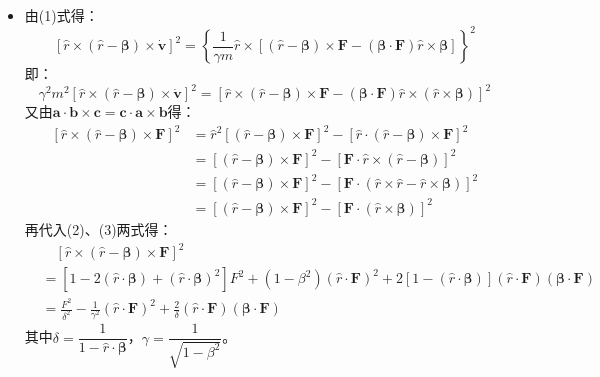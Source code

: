 \documentclass[a4paper,fontset=none]{ctexart}
\begin{document}
\begin{itemize}
    \item[7.(3)]
    由(1)式得：
    \[
        \left[\hat{r} \times (\hat{r}-\bm{\beta}) \times \dot{\bm{v}}\right]^2 = \left\{\frac{1}{\gamma m} \hat{r} \times \left[(\hat{r}-\bm{\beta}) \times \bm{F} - (\bm{\beta} \cdot \bm{F})\hat{r} \times \bm{\beta}\right]\right\}^2
    \]
    即：
    \begin{equation}
        \gamma^2m^2 \left[\hat{r} \times (\hat{r}-\bm{\beta}) \times \dot{\bm{v}}\right]^2 = \left[\hat{r} \times (\hat{r}-\bm{\beta}) \times \bm{F} - (\bm{\beta}\cdot\bm{F}) \hat{r} \times (\hat{r} \times \bm{\beta})\right]^2
    \end{equation}
    又由$\bm{a}\cdot\bm{b}\times\bm{c}=\bm{c}\cdot\bm{a}\times\bm{b}$得：
    \begin{align*}
        \left[\hat{r} \times (\hat{r}-\bm{\beta}) \times \bm{F}\right]^2
        &= \hat{r}^2 \left[(\hat{r}-\bm{\beta}) \times \bm{F}\right]^2 - \left[\hat{r} \cdot (\hat{r}-\bm{\beta}) \times \bm{F}\right]^2 \\
        &= \left[(\hat{r}-\bm{\beta}) \times \bm{F}\right]^2 - \left[\bm{F} \cdot \hat{r} \times (\hat{r}-\bm{\beta})\right]^2 \\
        &= \left[(\hat{r}-\bm{\beta}) \times \bm{F}\right]^2 - \left[\bm{F} \cdot (\hat{r}\times\hat{r} - \hat{r}\times\bm{\beta})\right]^2 \\
        &= \left[(\hat{r}-\bm{\beta}) \times \bm{F}\right]^2 - \left[\bm{F} \cdot (\hat{r} \times \bm{\beta})\right]^2
    \end{align*}
    再代入(2)、(3)两式得：
    \begin{equation}
        \begin{aligned}
            &\quad \left[\hat{r} \times (\hat{r}-\bm{\beta}) \times \bm{F}\right]^2 \\
            &= \left[1 - 2(\hat{r} \cdot \bm{\beta}) + (\hat{r} \cdot \bm{\beta})^2\right] F^2 + (1 - \beta^2) (\hat{r} \cdot \bm{F})^2 + 2\left[1 - (\hat{r} \cdot \bm{\beta})\right] (\hat{r} \cdot \bm{F}) (\bm{\beta} \cdot \bm{F}) \\
            &= \frac{F^2}{\delta^2} - \frac{1}{\gamma^2}(\hat{r} \cdot \bm{F})^2 + \frac{2}{\delta}(\hat{r} \cdot \bm{F})(\bm{\beta} \cdot \bm{F})
        \end{aligned}
    \end{equation}
    其中$\delta=\dfrac{1}{1-\hat{r}\cdot\bm{\beta}}$，$\gamma=\dfrac{1}{\sqrt{1-\beta^2}}$。


\end{itemize}
\end{document}
